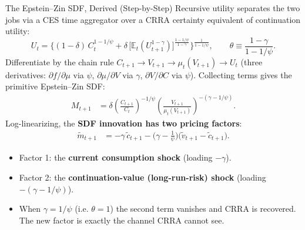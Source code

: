 \documentclass{beamer}
\newcommand{\E}{\mathbb{E}}
\newcommand{\tld}[1]{\widetilde{#1}}
\begin{document}
\begin{frame}{The Epstein--Zin SDF, Derived (Step-by-Step)}
\small
Recursive utility separates the two jobs via a CES time aggregator over a CRRA certainty equivalent of continuation utility:
\begin{equation*}
  U_t=\Big\{(1-\delta)\,C_t^{1-1/\psi}+\delta\,\big[\E_t(U_{t+1}^{1-\gamma})\big]^{\frac{1-1/\psi}{1-\gamma}}\Big\}^{\frac{1}{1-1/\psi}},
  \qquad \theta\equiv\frac{1-\gamma}{1-1/\psi}.
\end{equation*}
Differentiate by the chain rule $C_{t+1}\!\to\! V_{t+1}\!\to\!\mu_t(V_{t+1})\!\to\! U_t$ (three derivatives: $\partial f/\partial\mu$ via $\psi$, $\partial\mu/\partial V$ via $\gamma$, $\partial V/\partial C$ via $\psi$). Collecting terms gives the \alert{primitive Epstein--Zin SDF}:
\begin{align*}
  M_{t+1}&=\delta\left(\frac{C_{t+1}}{C_t}\right)^{-1/\psi}
           \left(\frac{V_{t+1}}{\mu_t(V_{t+1})}\right)^{-(\gamma-1/\psi)} .
\end{align*}
Log-linearizing, the \textbf{SDF innovation has two pricing factors}:
\begin{align*}
  \tld{m}_{t+1}&=-\gamma\,\tld{c}_{t+1}
                 -\Big(\gamma-\tfrac{1}{\psi}\Big)\big(\tld{v}_{t+1}-\tld{c}_{t+1}\big).
\end{align*}
\begin{itemize}
  \item Factor 1: the \textbf{current consumption shock} (loading $-\gamma$).
  \item Factor 2: the \textbf{continuation-value (long-run-risk) shock} (loading $-(\gamma-1/\psi)$).
  \item \alert{When $\gamma=1/\psi$ (i.e. $\theta=1$) the second term vanishes and CRRA is recovered.} The new factor is exactly the channel CRRA cannot see.
\end{itemize}
\end{frame}
\end{document}
